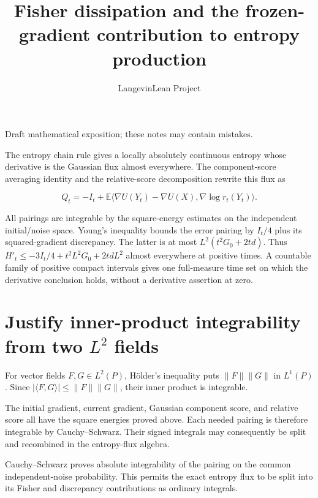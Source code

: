 \documentclass[11pt,a4paper]{article}
\title{\texorpdfstring{Fisher dissipation and the frozen-gradient contribution to entropy production}{Fisher dissipation and the frozen-gradient contribution to entropy production}}
\author{LangevinLean Project}
\date{}
\begin{document}
\maketitle
Draft mathematical exposition; these notes may contain mistakes.


The entropy chain rule gives a locally absolutely continuous entropy whose derivative is the Gaussian flux almost everywhere. The component-score averaging identity and the relative-score decomposition rewrite this flux as

\[Q_t=-I_t+\mathbb E\langle\nabla U(Y_t)-\nabla U(X),\nabla\log r_t(Y_t)\rangle.\]

All pairings are integrable by the square-energy estimates on the independent initial/\allowbreak{}noise space. Young's inequality bounds the error pairing by \(I_t/4\) plus its squared-gradient discrepancy. The latter is at most \(L^2(t^2G_0+2td)\). Thus \(H'_t\le-3I_t/4+t^2L^2G_0+2tdL^2\) almost everywhere at positive times. A countable family of positive compact intervals gives one full-measure time set on which the derivative conclusion holds, without a derivative assertion at zero.


\section{\texorpdfstring{Justify inner-product integrability from two \(L^2\) fields}{Justify inner-product integrability from two L² fields}}


For vector fields \(F,G\in L^2(P)\), Hölder's inequality puts \(\|F\|\|G\|\) in \(L^1(P)\). Since \(|\langle F,G\rangle|\le\|F\|\|G\|\), their inner product is integrable.



The initial gradient, current gradient, Gaussian component score, and relative score all have the square energies proved above. Each needed pairing is therefore integrable by Cauchy–Schwarz. Their signed integrals may consequently be split and recombined in the entropy-flux algebra.



Cauchy–Schwarz proves absolute integrability of the pairing on the common independent-noise probability. This permits the exact entropy flux to be split into its Fisher and discrepancy contributions as ordinary integrals.
\end{document}
